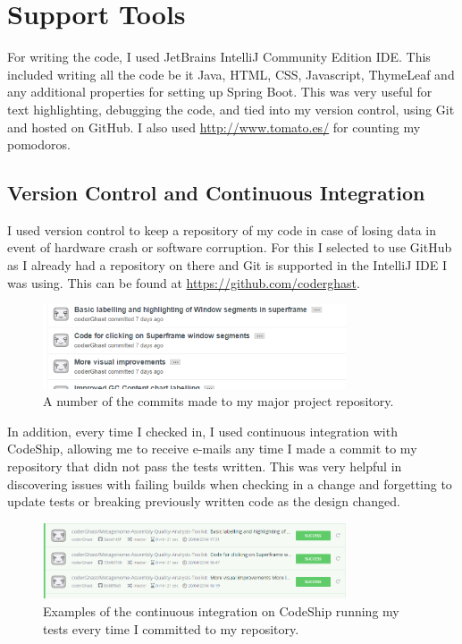 \section{Support Tools}
For writing the code, I used JetBrains IntelliJ Community Edition IDE. This included writing all the code be it Java, HTML, CSS, Javascript, ThymeLeaf and any additional properties for setting up Spring Boot. This was very useful for text highlighting, debugging the code, and tied into my version control, using Git and hosted on GitHub. I also used \url{http://www.tomato.es/} for counting my pomodoros.

\subsection{Version Control and Continuous Integration}
I used version control to keep a repository of my code in case of losing data in event of hardware crash or software corruption. For this I selected to use GitHub as I already had a repository on there and Git is supported in the IntelliJ IDE I was using. This can be found at \url{https://github.com/coderghast}.

\begin{figure}[H]
\centering
\includegraphics[width=0.8\textwidth]{images/commits}
\caption{A number of the commits made to my major project repository.}
\end{figure}

In addition, every time I checked in, I used continuous integration with CodeShip\cite{codeship}, allowing me to receive e-mails any time I made a commit to my repository that didn not pass the tests written. This was very helpful in discovering issues with failing builds when checking in a change and forgetting to update tests or breaking previously written code as the design changed.

\begin{figure}[H]
\centering
\includegraphics[width=0.8\textwidth]{images/codeship}
\caption{Examples of the continuous integration on CodeShip running my tests every time I committed to my repository.}
\end{figure}